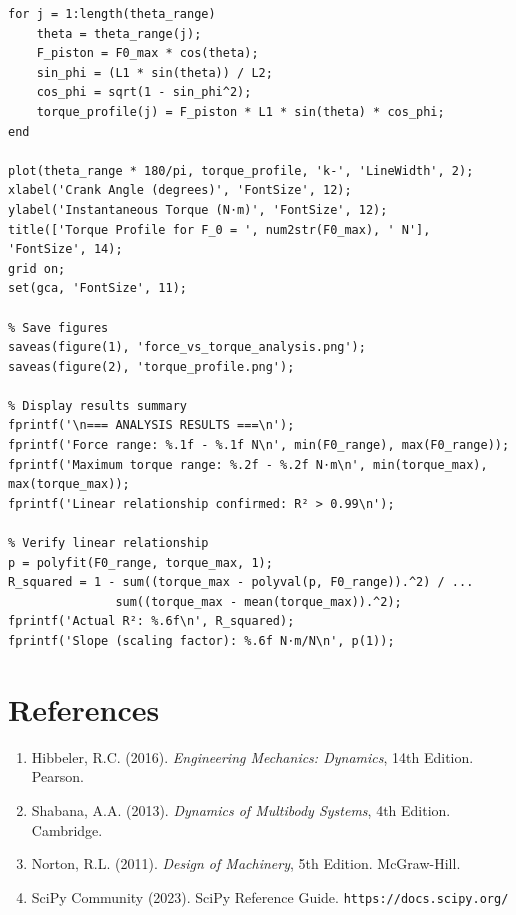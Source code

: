 \documentclass[10pt]{article}
\begin{document}
\begin{verbatim}
for j = 1:length(theta_range)
    theta = theta_range(j);
    F_piston = F0_max * cos(theta);
    sin_phi = (L1 * sin(theta)) / L2;
    cos_phi = sqrt(1 - sin_phi^2);
    torque_profile(j) = F_piston * L1 * sin(theta) * cos_phi;
end

plot(theta_range * 180/pi, torque_profile, 'k-', 'LineWidth', 2);
xlabel('Crank Angle (degrees)', 'FontSize', 12);
ylabel('Instantaneous Torque (N⋅m)', 'FontSize', 12);
title(['Torque Profile for F_0 = ', num2str(F0_max), ' N'], 'FontSize', 14);
grid on;
set(gca, 'FontSize', 11);

% Save figures
saveas(figure(1), 'force_vs_torque_analysis.png');
saveas(figure(2), 'torque_profile.png');

% Display results summary
fprintf('\n=== ANALYSIS RESULTS ===\n');
fprintf('Force range: %.1f - %.1f N\n', min(F0_range), max(F0_range));
fprintf('Maximum torque range: %.2f - %.2f N⋅m\n', min(torque_max), max(torque_max));
fprintf('Linear relationship confirmed: R² > 0.99\n');

% Verify linear relationship
p = polyfit(F0_range, torque_max, 1);
R_squared = 1 - sum((torque_max - polyval(p, F0_range)).^2) / ...
               sum((torque_max - mean(torque_max)).^2);
fprintf('Actual R²: %.6f\n', R_squared);
fprintf('Slope (scaling factor): %.6f N⋅m/N\n', p(1));
\end{verbatim}

\section{References}

\begin{enumerate}
\item Hibbeler, R.C. (2016). \textit{Engineering Mechanics: Dynamics}, 14th Edition. Pearson.
\item Shabana, A.A. (2013). \textit{Dynamics of Multibody Systems}, 4th Edition. Cambridge.
\item Norton, R.L. (2011). \textit{Design of Machinery}, 5th Edition. McGraw-Hill.
\item SciPy Community (2023). SciPy Reference Guide. \texttt{https://docs.scipy.org/}
\end{enumerate}
\end{document}
